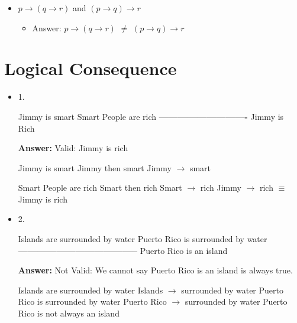 \documentclass[11pt]{article}
\begin{document}
\begin{itemize}
\item $ p \to (q \to r)$ and $ (p \to q) \to r$

 \begin{itemize}
\item Answer: $ p \to (q \to r)$ $ \ne  $ $ (p \to q) \to r$




\end{itemize}

 \end{itemize} 







\section*{Logical Consequence}



\begin{itemize}
\item 1. 

Jimmy is smart
\vskip 0.1in
Smart People are rich
\vskip 0.1in
 \textbf{----------------------------}
\vskip 0.1in
Jimmy is Rich 
 \vskip 0.1in
 
 
 \textbf{Answer:} Valid: Jimmy is rich 
 
 Jimmy is smart
\vskip 0.1in
Jimmy then smart
\vskip 0.1in
Jimmy $\to$ smart

Smart People are rich
\vskip 0.1in
Smart then rich 
\vskip 0.1in
Smart $\to$ rich 
\vskip 0.1in
Jimmy $\to$ rich $\equiv$ Jimmy is rich 

  


 \end{itemize} 
    
    
    
    
   
 
\begin{itemize}
\item 2. 

Islands are surrounded by water
\vskip 0.1in 
Puerto Rico is surrounded by water
\vskip 0.1in 
\textbf{--------------------------------------}
\vskip 0.1in 
Puerto Rico is an island
\vskip 0.1in


 \textbf{Answer:}  Not Valid: We cannot say Puerto Rico is an island is always true. 
 
 Islands are surrounded by water
 \vskip 0.1in
 Islands $\to$ surrounded by water
 \vskip 0.1in
  Puerto Rico is surrounded by water
 \vskip 0.1in
 Puerto Rico $\to$ surrounded by water
  \vskip 0.1in
  Puerto Rico is not always an island 
  
   
   
 \end{itemize} 
\end{document}
